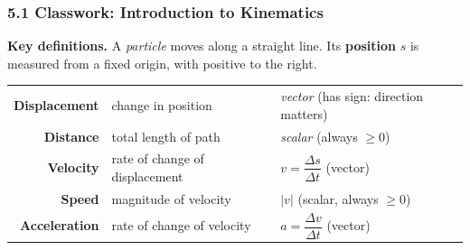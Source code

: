 \documentclass[12pt, twoside]{article}
\begin{document}
\subsubsection*{5.1 Classwork: Introduction to Kinematics}

\textbf{Key definitions.}
A \emph{particle} moves along a straight line.
Its \textbf{position} $s$ is measured from a fixed origin, with positive to the right.

\smallskip
\begin{tabular}{r@{\;---\;}l@{\qquad}l}
  \textbf{Displacement} & change in position & \emph{vector} (has sign: direction matters) \\
  \textbf{Distance}     & total length of path & \emph{scalar} (always $\geq 0$) \\
  \textbf{Velocity}     & rate of change of displacement &
    $v = \dfrac{\Delta s}{\Delta t}$ \;(vector) \\[4pt]
  \textbf{Speed}        & magnitude of velocity & $|v|$ \;(scalar, always $\geq 0$) \\
  \textbf{Acceleration} & rate of change of velocity &
    $a = \dfrac{\Delta v}{\Delta t}$ \;(vector)
\end{tabular}

\medskip
\end{document}
